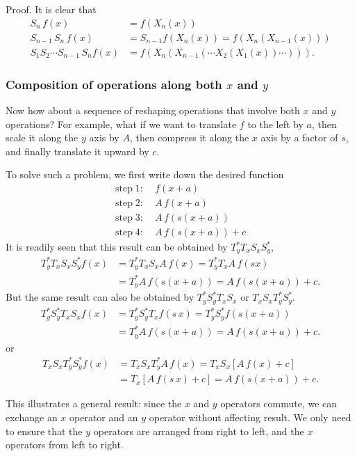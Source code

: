\documentclass{article}
\begin{document}
Proof. It is clear that
$$
\begin{aligned}
S_n \, f(x) &= f(X_n(x))
\\
S_{n-1} \, S_n \, f(x) &= S_{n-1} f(X_n(x)) = f(X_n(X_{n-1}(x)))
\\
S_1 S_2 \cdots S_{n-1} \, S_n f(x) &= f(X_n(X_{n-1}(\cdots X_2(X_1(x))\cdots))).
\end{aligned}
$$


\subsubsection{Composition of operations along both $x$ and $y$}

Now how about a sequence of reshaping operations that involve both $x$ and $y$ operations?
%
For example,
what if we want to translate $f$ to the left by $a$,
then scale it along the $y$ axis by $A$,
then compress it along the $x$ axis by a factor of $s$,
and finally translate it upward by $c$.

To solve such a problem, we first write down the desired function
$$
\begin{aligned}
\mathrm{step}\; 1:\;& f(x+a) \\
\mathrm{step}\; 2:\;& A \, f(x+a) \\
\mathrm{step}\; 3:\;& A \, f(s(x+a)) \\
\mathrm{step}\; 4:\;& A \, f(s(x+a)) + c
\end{aligned}
$$
It is readily seen that this result
can be obtained by $T_y^* T_x S_x S_y^*$,
$$
\begin{aligned}
T_y^* T_x S_x S_y^* f(x)
&= T_y^* T_x S_x A \, f(x) = T_y^* T_x A \, f(s x) \\
&= T_y^* A \, f(s(x+a)) = A \, f(s(x+a)) + c.
\end{aligned}
$$
But the same result can also be obtained by
$T_y^* S_y^* T_x S_x$ or $T_x S_x T_y^* S_y^*$.
$$
\begin{aligned}
T_y^* S_y^* T_x S_x f(x)
&= T_y^* S_y^* T_x f(s \, x) = T_y^* S_y^* f(s (x + a) ) \\
&= T_y^* A \, f(s(x+a)) = A \, f(s(x+a)) + c.
\end{aligned}
$$
or
$$
\begin{aligned}
T_x S_x T_y^* S_y^* f(x)
&= T_x S_x T_y^* A \, f(x) = T_x S_x [A \, f(x) + c] \\
&= T_x [A \, f(s \, x) + c] = A \, f(s(x+a)) + c.
\end{aligned}
$$

This illustrates a general result:
since the $x$ and $y$ operators commute,
we can exchange an $x$ operator
and an $y$ operator without affecting result.
%
We only need to ensure that the $y$ operators are arranged from right to left,
and the $x$ operators from left to right.
\end{document}
